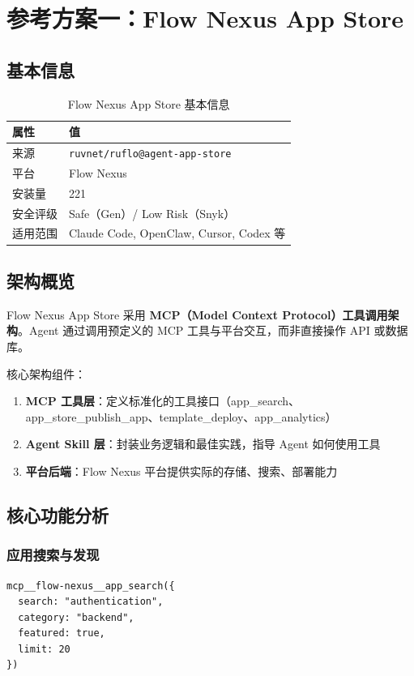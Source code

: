 \documentclass[11pt,a4paper]{article}
\begin{document}
\section{参考方案一：Flow Nexus App Store}

\subsection{基本信息}
\begin{table}[h]
\centering
\begin{tabular}{ll}
\toprule
\textbf{属性} & \textbf{值} \\
\midrule
来源 & \texttt{ruvnet/ruflo@agent-app-store} \\
平台 & Flow Nexus \\
安装量 & 221 \\
安全评级 & Safe（Gen）/ Low Risk（Snyk） \\
适用范围 & Claude Code, OpenClaw, Cursor, Codex 等 \\
\bottomrule
\end{tabular}
\caption{Flow Nexus App Store 基本信息}
\end{table}

\subsection{架构概览}
Flow Nexus App Store 采用 \textbf{MCP（Model Context Protocol）工具调用架构}。Agent 通过调用预定义的 MCP 工具与平台交互，而非直接操作 API 或数据库。

核心架构组件：
\begin{enumerate}
  \item \textbf{MCP 工具层}：定义标准化的工具接口（app\_search、app\_store\_publish\_app、template\_deploy、app\_analytics）
  \item \textbf{Agent Skill 层}：封装业务逻辑和最佳实践，指导 Agent 如何使用工具
  \item \textbf{平台后端}：Flow Nexus 平台提供实际的存储、搜索、部署能力
\end{enumerate}

\subsection{核心功能分析}

\subsubsection{应用搜索与发现}
\begin{lstlisting}[caption={MCP 工具调用示例：搜索应用}]
mcp__flow-nexus__app_search({
  search: "authentication",
  category: "backend",
  featured: true,
  limit: 20
})
\end{lstlisting}
\end{document}
